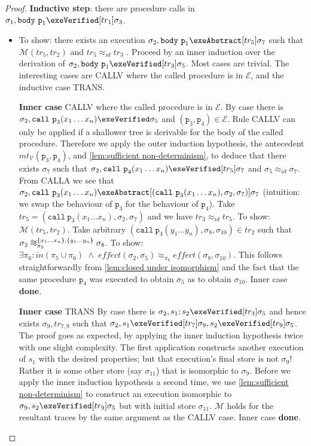 \documentclass[runningheads,a4paper]{llncs}
\DeclareMathOperator{\band}{\bm{\;\land\;}}
\DeclareMathOperator{\suchthat}{:}
\newcommand*{\qvars}[2]{#1_{#2}}
\newcommand*{\identity}[0]{\mathit{id}}
\newcommand{\tr}{tr}
\newcommand*\iso{\approx}
\newcommand*{\equivmap}{\mathcal{E}}
\newcommand*{\muttermname}{\mathit{mt}}
\newcommand*{\mutterm}[3]{{\muttermname}_{#1}(#2,#3)}
\newcommand*\Vsemantics{\mathcal{V}}
\newcommand*{\callRuleAbstract}{\textnormal{CALLA}}
\newcommand*{\callRuleConcrete}{\textnormal{CALLV}}
\newcommand*{\callRuleVerified}{\callRuleConcrete{}}
\newcommand*{\blTrans}{TRANS}
\newcommand{\diff}{\mathit{effect}}
\newcommand*{\call}{\mathtt{call}}
\newcommand*{\body}{\mathtt{body}}
\newcommand*{\fun}{\texttt{p}}
\newcommand*{\bijection}[1]{\mathit{in}{\left(#1\right)}}
\newcommand*{\wiso}{%
  \mathrel{\vcenter{\offinterlineskip
  \hbox{$\sim$}\vskip-.35ex\hbox{$\sim$}\vskip-.35ex\hbox{$\sim$}}}}
\newcommand*{\mutR}{\mathcal{M}}
\newcommand*{\store}{\sigma}
\begin{document}
\begin{proof}
\noindent\textbf{Inductive step}: there are procedure calls in $\store_1,\body~\fun_1\exeVerified[\tr_1]\store_3$. 
\begin{itemize}
\item[] To show: there exists an execution $\store_2,\body~\fun_1\exeAbstract[\tr_5]\store_7$ such that $\mutR(\tr_5,\tr_2)$ and $\tr_5\iso_\identity\tr_3$ \tagsix{}. 
%
Proceed by an inner induction over the derivation of $\store_2,\body~\fun_1\exeVerified[\tr_3]\store_5$.
%
Most cases are trivial. The interesting cases are \callRuleVerified{} where the called procedure is in $\equivmap$, and the inductive case \blTrans{}.

\noindent\textbf{Inner case} \callRuleVerified{} where the called procedure is in $\equivmap$. 
%
By case there is $\store_2,\call~\fun_3(x_1 \ldots x_n) \exeVerified\store_5$ and $(\fun_3,\fun_4) \in \equivmap$. 
%
Rule \callRuleVerified{} can only be applied if a shallower tree is derivable for the body of the called procedure. Therefore we apply the outer induction hypothesis, the antecedent $\mutterm{\Vsemantics}{\fun_3}{\fun_4}$, and \cref{lem:sufficient non-determinism}, to deduce that there exists $\store_7$ such that $\store_2,\call~\fun_4(x_1 \ldots x_n) \exeVerified[\tr_5]\store_7$ and $\store_5\iso_{\identity}\store_7$. From \callRuleAbstract{} we see that $\store_2,\call~\fun_3(x_1 \ldots x_n) \exeAbstract[(\call~\fun_3(x_1 \ldots x_n),\store_2,\store_7)]\store_7$ (intuition: we swap the behaviour of $\fun_3$ for the behaviour of $\fun_4$). Take $\tr_5=(\call~\fun_3(x_1 \ldots x_n),\store_2,\store_7)$ and we have $\tr_3\iso_{\identity}\tr_5$.
%
To show: $\mutR(\tr_5,\tr_2)$. Take arbitrary $(\call~\fun_4(y_1 \ldots y_n),\store_8,\store_{10}) \in \tr_2$ such that 
$\store_2 \wiso_{\pi_5}^{\{x_1 \ldots x_n\},\{y_1 \ldots y_n\}} \store_8$. To show: $\exists \pi_6 \suchthat \bijection{\pi_5 \cup \pi_6} \band \diff(\store_2,\store_5) \iso_{\pi_6} \diff(\store_8,\store_{10})$. This follows straightforwardly from \cref{lem:closed under isomorphism} and the fact that the same procedure $\fun_4$ was executed to obtain $\store_5$ as to obtain $\store_{10}$. Inner case \textbf{done}.

\noindent\textbf{Inner case} \blTrans{}
%
By case there is $\store_2,s_1;s_2 \exeVerified[\tr_3]\store_5$ and hence exists $\store_9,\qvars{\tr}{7,9}$ such that $\store_2,s_1 \exeVerified[\tr_7]\store_9,s_2 \exeVerified[\tr_9]\store_5$. The proof goes as expected, by applying the inner induction hypothesis twice with one slight complexity. The first application constructs another execution of $s_1$ with the desired properties; but that execution's final store is not $\store_9$! Rather it is some other store (say $\store_{11}$) that is isomorphic to $\store_9$. Before we apply the inner induction hypothesis a second time, we use \cref{lem:sufficient non-determinism} to construct an execution isomorphic to $\store_9,s_2 \exeVerified[\tr_9]\store_5$ but with initial store $\store_{11}$. $\mutR$ holds for the resultant traces by the same argument as the \callRuleVerified{} case. Inner case \textbf{done}.


\end{itemize}
\end{proof}
\end{document}
